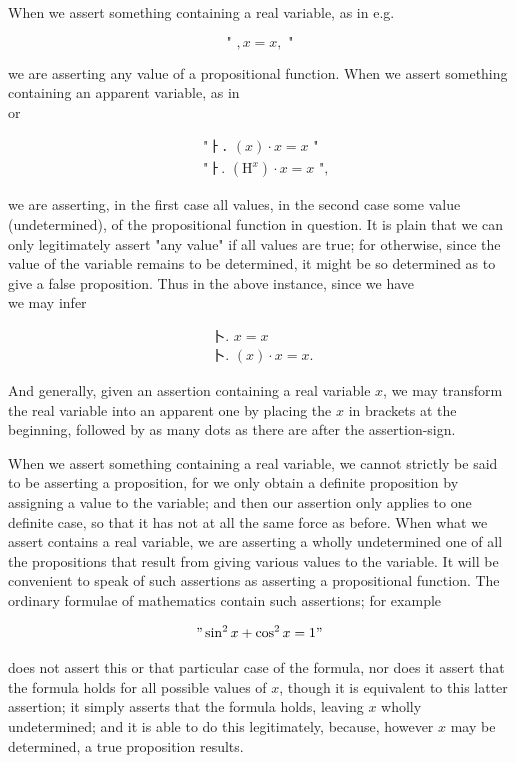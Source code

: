 \documentclass[10pt]{article}
\begin{document}
When we assert something containing a real variable, as in e.g.

$$
\text { " }, x=x, \text { " }
$$

we are asserting any value of a propositional function. When we assert something containing an apparent variable, as in\\
or

$$
\begin{aligned}
& \text { "ㅏ․ }(x) \cdot x=x \text { " } \\
& \text { "ㅏ. }\left(\mathrm{H}^{x}\right) \cdot x=x \text { ", }
\end{aligned}
$$

we are asserting, in the first case all values, in the second case some value (undetermined), of the propositional function in question. It is plain that we can only legitimately assert "any value" if all values are true; for otherwise, since the value of the variable remains to be determined, it might be so determined as to give a false proposition. Thus in the above instance, since we have\\
we may infer

$$
\begin{gathered}
\text { 卜. } x=x \\
\text { 卜. }(x) \cdot x=x .
\end{gathered}
$$

And generally, given an assertion containing a real variable $x$, we may transform the real variable into an apparent one by placing the $x$ in brackets at the beginning, followed by as many dots as there are after the assertion-sign.

When we assert something containing a real variable, we cannot strictly be said to be asserting a proposition, for we only obtain a definite proposition by assigning a value to the variable; and then our assertion only applies to one definite case, so that it has not at all the same force as before. When what we assert contains a real variable, we are asserting a wholly undetermined one of all the propositions that result from giving various values to the variable. It will be convenient to speak of such assertions as asserting a propositional function. The ordinary formulae of mathematics contain such assertions; for example

$$
" \sin ^{2} x+\cos ^{2} x=1 "
$$

does not assert this or that particular case of the formula, nor does it assert that the formula holds for all possible values of $x$, though it is equivalent to this latter assertion; it simply asserts that the formula holds, leaving $x$ wholly undetermined; and it is able to do this legitimately, because, however $x$ may be determined, a true proposition results.
\end{document}
